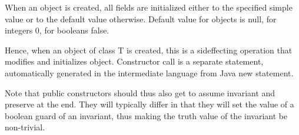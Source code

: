 When an object is created, all fields are initialized either
to the specified simple value or to the default value
otherwise.  Default value for objects is null, for integers
0, for booleans false.

Hence, when an object of class T is created, this is a
sideffecting operation that modifies  and
initializes object.  Constructor call is a separate
statement, automatically generated in the intermediate
language from Java new statement.

Note that public constructors should thus also get to assume invariant
and preserve at the end.  They will typically differ in that they will
set the value of a boolean guard of an invariant, thus making the
truth value of the invariant be non-trivial.
